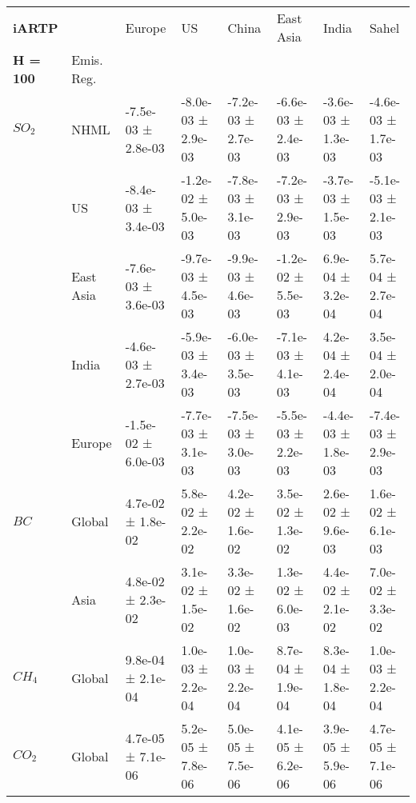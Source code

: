 \documentclass[preview]{standalone}
\newcommand{\nm}{\phantom{-}}
\begin{document}
	\tiny
	\begin{minipage}{\textwidth}
		\setlength\tabcolsep{5pt}
		\begin{tabular}{llllllll}
			\toprule
			\textbf{iARTP}        &        &               Europe &                   US &                China &            East Asia &                India &                Sahel \\
			\textbf{H = 100}   & Emis. Reg. &                      &                      &                      &                      &                      &                      \\
			\midrule
$SO_2$ & NHML &  -7.5e-03 ±  2.8e-03 &  -8.0e-03 ±  2.9e-03 &  -7.2e-03 ±  2.7e-03 &  -6.6e-03 ±  2.4e-03 &  -3.6e-03 ±  1.3e-03 &  -4.6e-03 ±  1.7e-03 \\
       & US &  -8.4e-03 ±  3.4e-03 &  -1.2e-02 ±  5.0e-03 &  -7.8e-03 ±  3.1e-03 &  -7.2e-03 ±  2.9e-03 &  -3.7e-03 ±  1.5e-03 &  -5.1e-03 ±  2.1e-03 \\
       & East Asia &  -7.6e-03 ±  3.6e-03 &  -9.7e-03 ±  4.5e-03 &  -9.9e-03 ±  4.6e-03 &  -1.2e-02 ±  5.5e-03 &   \nm6.9e-04 ±  3.2e-04 &   \nm5.7e-04 ±  2.7e-04 \\
       & India &  -4.6e-03 ±  2.7e-03 &  -5.9e-03 ±  3.4e-03 &  -6.0e-03 ±  3.5e-03 &  -7.1e-03 ±  4.1e-03 &   \nm4.2e-04 ±  2.4e-04 &   \nm3.5e-04 ±  2.0e-04 \\
       & Europe &  -1.5e-02 ±  6.0e-03 &  -7.7e-03 ±  3.1e-03 &  -7.5e-03 ±  3.0e-03 &  -5.5e-03 ±  2.2e-03 &  -4.4e-03 ±  1.8e-03 &  -7.4e-03 ±  2.9e-03 \\
\cmidrule(lr){1-8}
$BC$ & Global &   \nm4.7e-02 ±  1.8e-02 &   \nm5.8e-02 ±  2.2e-02 &   \nm4.2e-02 ±  1.6e-02 &   \nm3.5e-02 ±  1.3e-02 &   \nm2.6e-02 ±  9.6e-03 &   \nm1.6e-02 ±  6.1e-03 \\
       & Asia &   \nm4.8e-02 ±  2.3e-02 &   \nm3.1e-02 ±  1.5e-02 &   \nm3.3e-02 ±  1.6e-02 &   \nm1.3e-02 ±  6.0e-03 &   \nm4.4e-02 ±  2.1e-02 &   \nm7.0e-02 ±  3.3e-02 \\
\cmidrule(lr){1-8}
$CH_4$ & Global &   \nm9.8e-04 ±  2.1e-04 &   \nm1.0e-03 ±  2.2e-04 &   \nm1.0e-03 ±  2.2e-04 &   \nm8.7e-04 ±  1.9e-04 &   \nm8.3e-04 ±  1.8e-04 &   \nm1.0e-03 ±  2.2e-04 \\
\cmidrule(lr){1-8}
$CO_2$ & Global &   \nm4.7e-05 ±  7.1e-06 &   \nm5.2e-05 ±  7.8e-06 &   \nm5.0e-05 ±  7.5e-06 &   \nm4.1e-05 ±  6.2e-06 &   \nm3.9e-05 ±  5.9e-06 &   \nm4.7e-05 ±  7.1e-06 \\
\bottomrule
\end{tabular}

        \end{minipage}
        
\end{document}
